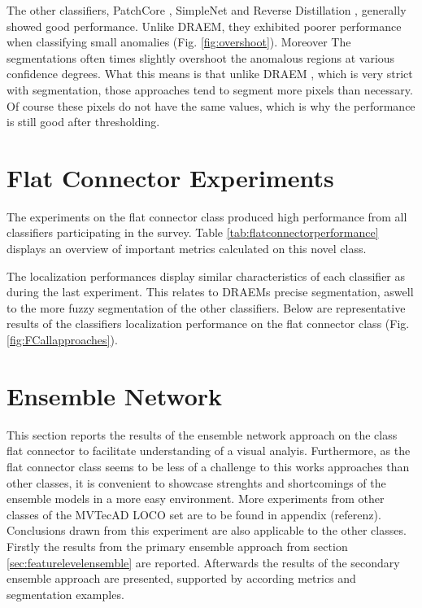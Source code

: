 

The other classifiers, PatchCore \cite{patchCore2022}, SimpleNet \cite{liu2023simplenet} and Reverse Distillation \cite{revdist2023}, generally showed good performance. Unlike DRAEM, they exhibited 
poorer performance when classifying small anomalies (Fig. \ref{fig:overshoot}). Moreover The segmentations often times slightly overshoot the anomalous regions at various confidence 
degrees. What this means is that unlike DRAEM \cite{Zavrtanik_2021DRAEM}, which is very strict with segmentation, those approaches tend to segment more pixels than necessary. 
Of course these pixels do not have the same values, which is why the performance is still good after thresholding. 





\section{Flat Connector Experiments}
\label{sec:faltconnectorxperiments}

The experiments on the flat connector class produced high performance from all classifiers participating in the survey. Table \ref{tab:flatconnectorperformance} 
displays an overview of important metrics calculated on this novel class.



The localization performances display similar characteristics of each classifier as during the last experiment. This relates to DRAEMs \cite{Zavrtanik_2021DRAEM} precise segmentation, 
aswell to the more fuzzy segmentation of the other classifiers. Below are representative results of the classifiers localization performance on the flat connector class (Fig. \ref{fig:FCallapproaches}).






\section{Ensemble Network}
\label{sec:ensembleresults}

This section reports the results of the ensemble network approach on the class flat connector to facilitate understanding of a visual 
analyis. Furthermore, as the flat connector class seems to be less of a challenge to this works approaches than other classes, it is convenient to showcase strenghts and 
shortcomings of the ensemble models in a more easy environment. More experiments from other classes of the MVTecAD LOCO \cite{LOCODentsAndScratchesBergmann2022} set are to be found in appendix (referenz). 
Conclusions drawn from this 
experiment are also applicable to the other classes. Firstly the results from the primary ensemble approach from section \ref{sec:featurelevelensemble} are reported. Afterwards 
the results of the secondary ensemble approach are presented, supported by according metrics and segmentation examples.


